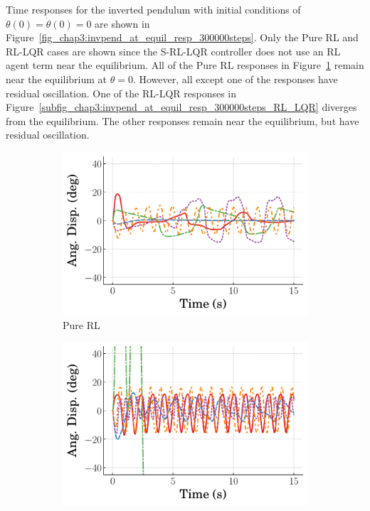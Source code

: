 Time responses for the inverted pendulum with initial conditions of $\theta(0)=\dot{\theta}(0)=0$ are shown in Figure~\ref{fig_chap3:invpend_at_equil_resp_300000steps}. Only the Pure RL and RL-LQR cases are shown since the S-RL-LQR controller does not use an RL agent term near the equilibrium. 
All of the Pure RL responses in Figure~\ref{subfig_chap3:invpend_at_equil_resp_300000steps_pure_RL} remain near the equilibrium at $\theta=0$. However, all except one of the responses have residual oscillation.
%
One of the RL-LQR responses in Figure~\ref{subfig_chap3:invpend_at_equil_resp_300000steps_RL_LQR} diverges from the equilibrium. The other responses remain near the equilibrium, but have residual oscillation.
%
\begin{figure}[tb]
  \centering
  \begin{subfigure}[b]{0.49\textwidth}
      \centering
      \includegraphics[width=\textwidth]{figures/figures_stability/time_responses_invpend/invpend_pure_RL/Angular_displacement_0_init_300000_steps.pdf}
      \caption{Pure RL}
      \label{subfig_chap3:invpend_at_equil_resp_300000steps_pure_RL}
  \end{subfigure}
  \hfill
  \begin{subfigure}[b]{0.49\textwidth}
      \centering
      \includegraphics[width=\textwidth]{figures/figures_stability/time_responses_invpend/invpend_RL_LQR/Angular_displacement_0_init_300000_steps.pdf}

\end{subfigure}
\end{figure}
